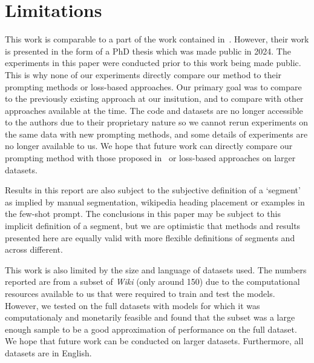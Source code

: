 \section*{Limitations}

This work is comparable to a part of the work contained in~\cite{XingThesis}. However, their work is presented in the form of a PhD thesis which was made public in 2024. The experiments in this paper were conducted prior to this work being made public. This is why none of our experiments directly compare our method to their prompting methods or loss-based approaches. Our primary goal was to compare to the previously existing approach at our insitution, and to compare with other approaches available at the time. The code and datasets are no longer accessible to the authors due to their proprietary nature so we cannot rerun experiments on the same data with new prompting methods, and some details of experiments are no longer available to us. We hope that future work can directly compare our prompting method with those proposed in~\cite{XingThesis} or loss-based approaches on larger datasets.

Results in this report are also subject to the subjective definition of a `segment' as implied by manual segmentation, wikipedia heading placement or examples in the few-shot prompt. The conclusions in this paper may be subject to this implicit definition of a segment, but we are optimistic that methods and results presented here are equally valid with more flexible definitions of segments and across different.

This work is also limited by the size and language of datasets used. The numbers reported are from a subset of \emph{Wiki} (only around 150) due to the computational resources available to us that were required to train and test the models. However, we tested on the full datasets with models for which it was computationaly and monetarily feasible and found that the subset was a large enough sample to be a good approximation of performance on the full dataset. We hope that future work can be conducted on larger datasets. Furthermore, all datasets are in English.